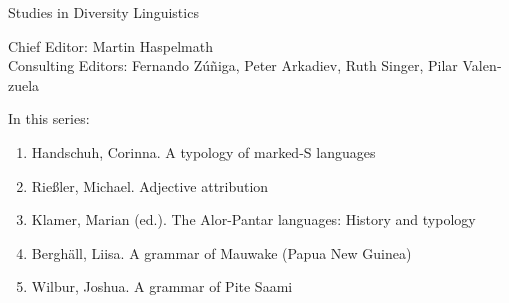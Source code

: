 
{\large Studies in Diversity Linguistics}

\bigskip

Chief Editor: Martin Haspelmath \\
Consulting Editors: Fernando Zúñiga, Peter Arkadiev, Ruth Singer, Pilar Valen­zuela

\bigskip

In this series:

\begin{enumerate}
\item Handschuh, Corinna. A typology of marked-S languages
\item Rießler, Michael. Adjective attribution
\item Klamer, Marian (ed.). The Alor-Pantar languages: History and typology
\item Berghäll, Liisa. A grammar of Mauwake (Papua New Guinea)
\item Wilbur, Joshua. A grammar of Pite Saami
\end{enumerate}


